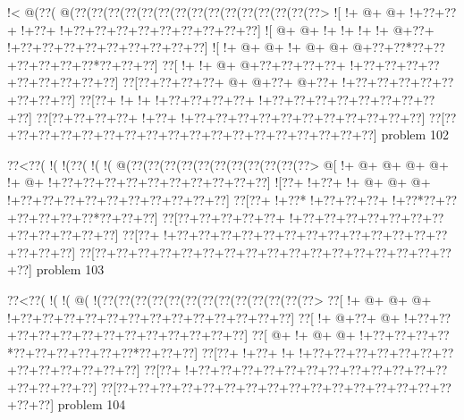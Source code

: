 \vbox{\vbox{\goo
\- !<\- @(\0??(\- @(\0??(\0??(\0??(\0??(\0??(\0??(\0??(\0??(\0??(\0??(\0??(\0??(\0??(\0??(\0??>
\- ![\- !+\- @+\- @+\- !+\0??+\0??+\- !+\0??+\- !+\0??+\0??+\0??+\0??+\0??+\0??+\0??+\0??+\0??]
\- ![\- @+\- @+\- !+\- !+\- !+\- !+\- @+\0??+\- !+\0??+\0??+\0??+\0??+\0??+\0??+\0??+\0??+\0??]
\- ![\- !+\- @+\- @+\- !+\- @+\- @+\- @+\0??+\0??*\0??+\0??+\0??+\0??+\0??+\0??*\0??+\0??+\0??]
\0??[\- !+\- !+\- @+\- @+\0??+\0??+\0??+\0??+\- !+\0??+\0??+\0??+\0??+\0??+\0??+\0??+\0??+\0??]
\0??[\0??+\0??+\0??+\0??+\- @+\- @+\0??+\- @+\0??+\- !+\0??+\0??+\0??+\0??+\0??+\0??+\0??+\0??]
\0??[\0??+\- !+\- !+\- !+\0??+\0??+\0??+\0??+\- !+\0??+\0??+\0??+\0??+\0??+\0??+\0??+\0??+\0??]
\0??[\0??+\0??+\0??+\0??+\- !+\0??+\- !+\0??+\0??+\0??+\0??+\0??+\0??+\0??+\0??+\0??+\0??+\0??]
\0??[\0??+\0??+\0??+\0??+\0??+\0??+\0??+\0??+\0??+\0??+\0??+\0??+\0??+\0??+\0??+\0??+\0??+\0??]
}
\hfil problem 102\hfil\break
}



\vbox{\vbox{\goo
\0??<\0??(\- !(\- !(\0??(\- !(\- !(\- @(\0??(\0??(\0??(\0??(\0??(\0??(\0??(\0??(\0??(\0??(\0??>
\- @[\- !+\- @+\- @+\- @+\- @+\- !+\- @+\- !+\0??+\0??+\0??+\0??+\0??+\0??+\0??+\0??+\0??+\0??]
\- ![\0??+\- !+\0??+\- !+\- @+\- @+\- @+\- !+\0??+\0??+\0??+\0??+\0??+\0??+\0??+\0??+\0??+\0??]
\0??[\0??+\- !+\0??*\- !+\0??+\0??+\0??+\- !+\0??*\0??+\0??+\0??+\0??+\0??+\0??*\0??+\0??+\0??]
\0??[\0??+\0??+\0??+\0??+\0??+\- !+\0??+\0??+\0??+\0??+\0??+\0??+\0??+\0??+\0??+\0??+\0??+\0??]
\0??[\0??+\- !+\0??+\0??+\0??+\0??+\0??+\0??+\0??+\0??+\0??+\0??+\0??+\0??+\0??+\0??+\0??+\0??]
\0??[\0??+\0??+\0??+\0??+\0??+\0??+\0??+\0??+\0??+\0??+\0??+\0??+\0??+\0??+\0??+\0??+\0??+\0??]
}
\hfil problem 103\hfil\break
}



\vbox{\vbox{\goo
\0??<\0??(\- !(\- !(\- @(\- !(\0??(\0??(\0??(\0??(\0??(\0??(\0??(\0??(\0??(\0??(\0??(\0??(\0??>
\0??[\- !+\- @+\- @+\- @+\- !+\0??+\0??+\0??+\0??+\0??+\0??+\0??+\0??+\0??+\0??+\0??+\0??+\0??]
\0??[\- !+\- @+\0??+\- @+\- !+\0??+\0??+\0??+\0??+\0??+\0??+\0??+\0??+\0??+\0??+\0??+\0??+\0??]
\0??[\- @+\- !+\- @+\- @+\- !+\0??+\0??+\0??+\0??*\0??+\0??+\0??+\0??+\0??+\0??*\0??+\0??+\0??]
\0??[\0??+\- !+\0??+\- !+\- !+\0??+\0??+\0??+\0??+\0??+\0??+\0??+\0??+\0??+\0??+\0??+\0??+\0??]
\0??[\0??+\- !+\0??+\0??+\0??+\0??+\0??+\0??+\0??+\0??+\0??+\0??+\0??+\0??+\0??+\0??+\0??+\0??]
\0??[\0??+\0??+\0??+\0??+\0??+\0??+\0??+\0??+\0??+\0??+\0??+\0??+\0??+\0??+\0??+\0??+\0??+\0??]
}
\hfil problem 104\hfil\break
}



